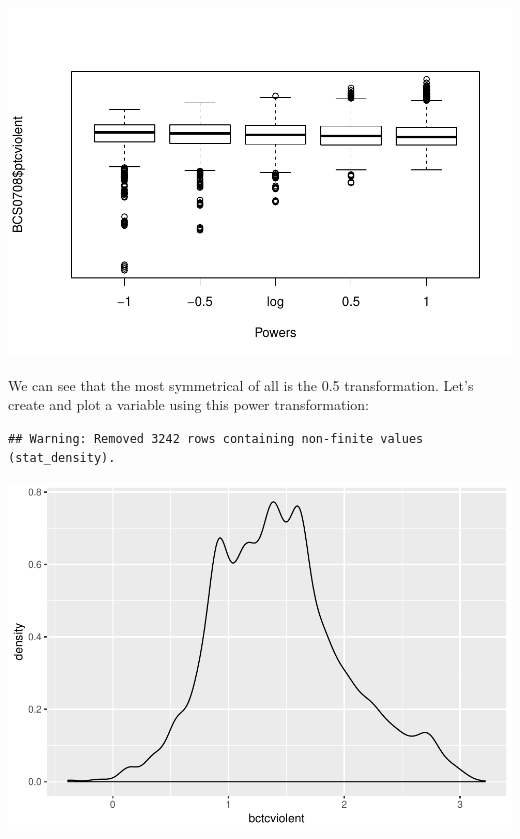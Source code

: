 \documentclass[]{book}
\newenvironment{Shaded}{\begin{snugshade}}{\end{snugshade}}
\newcommand{\DataTypeTok}[1]{\textcolor[rgb]{0.13,0.29,0.53}{#1}}
\newcommand{\FloatTok}[1]{\textcolor[rgb]{0.00,0.00,0.81}{#1}}
\newcommand{\KeywordTok}[1]{\textcolor[rgb]{0.13,0.29,0.53}{\textbf{#1}}}
\newcommand{\NormalTok}[1]{#1}
\newcommand{\OperatorTok}[1]{\textcolor[rgb]{0.81,0.36,0.00}{\textbf{#1}}}
\newcommand{\StringTok}[1]{\textcolor[rgb]{0.31,0.60,0.02}{#1}}
\theoremstyle{definition}
\theoremstyle{definition}
\theoremstyle{definition}
\theoremstyle{remark}
\begin{document}
\includegraphics{06-hypothesis_testing_files/figure-latex/unnamed-chunk-21-1.pdf}

We can see that the most symmetrical of all is the 0.5 transformation.
Let's create and plot a variable using this power transformation:

\begin{Shaded}
\end{Shaded}

\begin{verbatim}
## Warning: Removed 3242 rows containing non-finite values (stat_density).
\end{verbatim}

\includegraphics{06-hypothesis_testing_files/figure-latex/unnamed-chunk-22-1.pdf}
\end{document}
